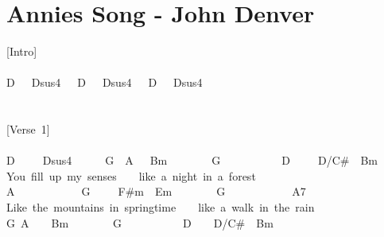 \documentclass[]{book}
\let\stdsection\section
\renewcommand\section{\clearpage\stdsection}
\begin{document}
\hypertarget{annies-song---john-denver}{%
\section{Annies Song - John Denver}\label{annies-song---john-denver}}

{[}Intro{]}\\
~\\
D~~~Dsus4~~~D~~~Dsus4~~~D~~~Dsus4\\
~\\
~\\
{[}Verse~1{]}\\
~\\
D~~~~~Dsus4~~~~~~G~~A~~~Bm~~~~~~~~G~~~~~~~~~~~D~~~~~D/C\#~~Bm\\
\hspace*{0.333em}\hspace*{0.333em}You~fill~up~my~senses~~~~like~a~night~in~a~forest\\
\hspace*{0.333em}\hspace*{0.333em}\hspace*{0.333em}\hspace*{0.333em}\hspace*{0.333em}\hspace*{0.333em}\hspace*{0.333em}\hspace*{0.333em}\hspace*{0.333em}A~~~~~~~~~~~~G~~~~~F\#m~~Em~~~~~~~~G~~~~~~~~~~~~A7\\
Like~the~mountains~in~springtime~~~~like~a~walk~in~the~rain\\
\hspace*{0.333em}\hspace*{0.333em}\hspace*{0.333em}\hspace*{0.333em}\hspace*{0.333em}\hspace*{0.333em}\hspace*{0.333em}\hspace*{0.333em}\hspace*{0.333em}\hspace*{0.333em}\hspace*{0.333em}\hspace*{0.333em}\hspace*{0.333em}\hspace*{0.333em}\hspace*{0.333em}\hspace*{0.333em}\hspace*{0.333em}\hspace*{0.333em}\hspace*{0.333em}\hspace*{0.333em}G~A~~~~Bm~~~~~~~~G~~~~~~~~~~~D~~~~D/C\#~~Bm\\
\end{document}

